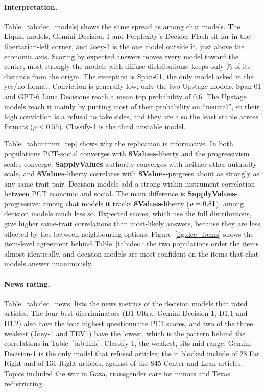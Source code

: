 \documentclass[11pt]{article}
\newcommand{\instSAP}[1]{\textcolor{cSAP}{\textbf{#1}}}
\newcommand{\instEV}[1]{\textcolor{cEV}{\textbf{#1}}}
\newcommand{\sap}{\instSAP{SapplyValues}\xspace}
\newcommand{\ev}{\instEV{8Values}\xspace}
\begin{document}
\paragraph{Interpretation.} Table~\ref{tab:dec_models} shows the same spread as among chat models. The Liquid models, Gemini Decision-1 and Perplexity's Decider Flash sit far in the libertarian-left corner, and Joey-1 is the one model outside it, just above the economic axis. Scoring by expected answers moves every model toward the centre, most strongly the models with diffuse distributions: \nDShrinkMinModel{} keeps only \nDShrinkMin\% of its distance from the origin. The exception is Span-01, the only model asked in the yes/no format. Conviction is generally low; only the two Upstage models, Span-01 and GPT-6 Luna Decisions reach a mean top probability of 0.6. The Upstage models reach it mainly by putting most of their probability on ``neutral'', so their high conviction is a refusal to take sides, and they are also the least stable across formats ($\rho\leq0.55$). Classify-1 is the third unstable model.

Table~\ref{tab:mtmm_rep} shows why the replication is informative. In both populations PCT-social converges with \ev-liberty and the progressivism scales converge, \sap authority converges with neither other authority scale, and \ev-liberty correlates with \ev-progress about as strongly as any same-trait pair. Decision models add a strong within-instrument correlation between PCT economic and social. The main difference is \sap-progressive: among chat models it tracks \ev-liberty ($\rho=0.81$), among decision models much less so. Expected scores, which use the full distributions, give higher same-trait correlations than most-likely answers, because they are less affected by ties between neighbouring options. Figure~\ref{fig:dec_items} shows the item-level agreement behind Table~\ref{tab:dec}: the two populations order the \nNItems{} items almost identically, and decision models are most confident on the items that chat models answer unanimously.



\paragraph{News rating.} Table~\ref{tab:dec_news} lists the news metrics of the \nDNNews{} decision models that rated articles. The four best discriminators (D1 Ultra, Gemini Decision-1, D1.1 and D1.2) also have the four highest questionnaire PC1 scores, and two of the three weakest (Joey-1 and TEV1) have the lowest, which is the pattern behind the correlations in Table~\ref{tab:link}. Classify-1, the weakest, sits mid-range. Gemini Decision-1 is the only model that refused articles; the \nGemRefused{} it blocked include \nGemRefFarRight{} of 28 Far Right and \nGemRefRight{} of 131 Right articles, against \nGemRefMid{} of the 845 Center and Lean articles. Topics included the war in Gaza, transgender care for minors and Texas redistricting.
\end{document}
